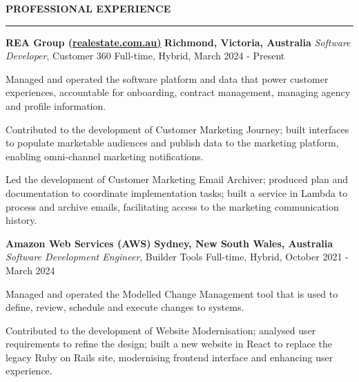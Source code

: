 \documentclass{cv}
\begin{document}
\textbf{\uppercase{Professional Experience}}
\sectionlineskip
\hrule height 0.6pt
\begin{list}{}{\setlength{\leftmargin}{0pt}}
\itemsep 2.0pt
\item
    \textbf{REA Group (\href{https://realestate.com.au/}{realestate.com.au)}} \hfill \textbf{Richmond, Victoria, Australia}%
    \vspace{1.0pt} \newline 
    {\textit{Software Developer}, Customer 360} \hfill {Full-time, Hybrid, March 2024 - Present}%
    \begin{list}{\raisebox{2.0pt}{\tiny$\bullet$}\space}{\setlength{\leftmargin}{11.2pt}}
        \itemsep -4.0pt \vspace{-4.0pt}
        \item Managed and operated the software platform and data that power customer experiences, accountable for onboarding, contract management, managing agency and profile information.
        \item Contributed to the development of Customer Marketing Journey; built interfaces to populate marketable audiences and publish data to the marketing platform, enabling omni-channel marketing notifications.
        \item Led the development of Customer Marketing Email Archiver; produced plan and documentation to coordinate implementation tasks; built a service in Lambda to process and archive emails, facilitating access to the marketing communication history.
    \end{list}
\item 
    \textbf{Amazon Web Services (AWS)} \hfill \textbf{Sydney, New South Wales, Australia}%
    \vspace{1.0pt} \newline 
    {\textit{Software Development Engineer}, Builder Tools} \hfill {Full-time, Hybrid, October 2021 - March 2024}%
    \begin{list}{\raisebox{2.0pt}{\tiny$\bullet$}\space}{\setlength{\leftmargin}{11.2pt}}
        \itemsep -4.0pt \vspace{-4.0pt}
        \item Managed and operated the Modelled Change Management tool that is used to define, review, schedule and execute changes to systems.
        \item Contributed to the development of Website Modernisation; analysed user requirements to refine the design; built a new website in React to replace the legacy Ruby on Rails site, modernising frontend interface and enhancing user experience.

\end{list}
\end{list}
\end{document}
